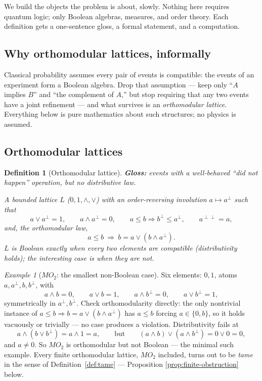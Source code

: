 \documentclass[11pt]{article}
\newtheorem{definition}[theorem]{Definition}
\theoremstyle{remark}
\newtheorem{example}[theorem]{Example}
\begin{document}
We build the objects the problem is about, slowly. Nothing here requires
quantum logic; only Boolean algebras, measures, and order theory. Each
definition gets a one-sentence gloss, a formal statement, and a computation.

\subsection{Why orthomodular lattices, informally}

Classical probability assumes every pair of events is compatible: the events
of an experiment form a Boolean algebra. Drop that assumption — keep only
``$A$ implies $B$'' and ``the complement of $A$,'' but stop requiring that any
two events have a joint refinement — and what survives is an
\emph{orthomodular lattice}. Everything below is pure mathematics about such
structures; no physics is assumed.

\subsection{Orthomodular lattices}

\begin{definition}[Orthomodular lattice]
\label{def:oml}
\textbf{Gloss:} events with a well-behaved ``did not happen'' operation, but
no distributive law.

\smallskip
\noindent A bounded lattice $L$ ($0,1,\wedge,\vee$) with an order-reversing
involution $a\mapsto a^\perp$ such that
\[
  a\vee a^\perp = 1,\qquad a\wedge a^\perp = 0,\qquad a\le b\Rightarrow
  b^\perp\le a^\perp,\qquad a^{\perp\perp}=a,
\]
and, the \emph{orthomodular law},
\[
  a\le b \ \Longrightarrow\ b = a\vee(b\wedge a^\perp).
\]
$L$ is Boolean exactly when every two elements are compatible (distributivity
holds); the interesting case is when they are not.
\end{definition}

\begin{example}[$MO_2$: the smallest non-Boolean case]
\label{ex:mo2}
Six elements: $0,1$, atoms $a,a^\perp,b,b^\perp$, with
\[
  a\wedge b = 0,\qquad a\vee b = 1,\qquad a\wedge b^\perp = 0,\qquad
  a\vee b^\perp = 1,
\]
symmetrically in $a^\perp,b^\perp$. Check orthomodularity directly: the only
nontrivial instance of $a\le b\Rightarrow b=a\vee(b\wedge a^\perp)$ has $a\le
b$ forcing $a\in\{0,b\}$, so it holds vacuously or trivially — no case
produces a violation. Distributivity fails at
\[
  a\wedge(b\vee b^\perp) = a\wedge 1 = a,\qquad\text{but}\qquad
  (a\wedge b)\vee(a\wedge b^\perp) = 0\vee 0 = 0,
\]
and $a\neq 0$. So $MO_2$ is orthomodular but not Boolean — the minimal such
example. Every finite orthomodular lattice, $MO_2$ included, turns out to be
\emph{tame} in the sense of Definition~\ref{def:tame} — Proposition
\ref{prop:finite-obstruction} below.
\end{example}
\end{document}
